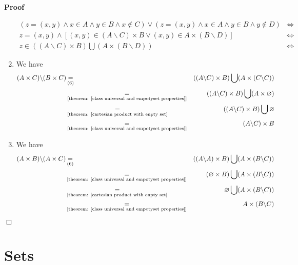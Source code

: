 \documentclass{book}
\newcommand{\equallim}{\mathop{=}\limits}
\newcommand{\nin}{\not\in}
\newenvironment{proof}{\noindent\textbf{Proof\ }}{\hspace*{\fill}$\Box$\medskip}
\begin{document}
\begin{proof}
\begin{enumerate}
\begin{eqnarray*}
      (z = (x, y) \wedge x \in A \wedge y \in B \wedge x \nin C) \vee (z = (x,
      y) \wedge x \in A \wedge y \in B \wedge y \nin D) & \Leftrightarrow & \\
      z = (x, y) \wedge [(x, y) \in (A\backslash C) \times B \vee (x, y) \in A
      \times (B\backslash D)] & \Leftrightarrow & \\
      z \in ((A\backslash C) \times B) \bigcup (A \times (B\backslash D)) &
      \Leftrightarrow & 
    \end{eqnarray*}
    \item We have
    \begin{eqnarray*}
      (A \times C) \backslash (B \times C) & \equallim_{(6)} & ((A\backslash
      C) \times B) \bigcup (A \times (C\backslash C))\\
      & \equallim_{\text{[theorem: \ref{class universal and empotyset
      properties}]}} & ((A\backslash C) \times B) \bigcup (A \times
      \varnothing)\\
      & \equallim_{\text{[theorem: \ref{cartesian product with enpty set}}} &
      ((A\backslash C) \times B) \bigcup \varnothing\\
      & \equallim_{\text{[theorem: \ref{class universal and empotyset
      properties}]}} & (A\backslash C) \times B
    \end{eqnarray*}
    \item We have
    \begin{eqnarray*}
      (A \times B) \backslash (A \times C) & \equallim_{(6)} & ((A\backslash
      A) \times B) \bigcup (A \times (B\backslash C))\\
      & \equallim_{\text{[theorem: \ref{class universal and empotyset
      properties}]}} & (\varnothing \times B) \bigcup (A \times (B\backslash
      C))\\
      & \equallim_{\text{[theorem: \ref{cartesian product with enpty set}}} &
      \varnothing \bigcup (A \times (B\backslash C))\\
      & \equallim_{\text{[theorem: \ref{class universal and empotyset
      properties}]}} & A \times (B\backslash C)
    \end{eqnarray*}
  \end{enumerate}
\end{proof}

\section{Sets}
\end{document}
